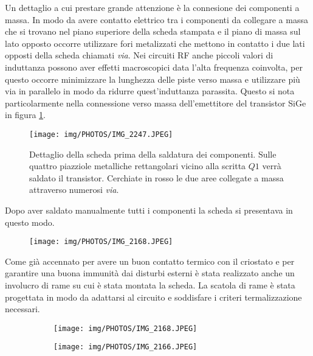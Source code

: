 \documentclass[12pt,oneside]{book}
\begin{document}
Un dettaglio a cui prestare grande attenzione è la connesione dei componenti a massa. In modo da avere contatto elettrico tra i componenti da collegare a massa che si trovano nel piano superiore della scheda stampata e il piano di massa sul lato opposto occorre utilizzare fori metalizzati che mettono in contatto i due lati opposti della scheda chiamati \textit{via}. Nei circuiti RF anche piccoli valori di induttanza possono aver effetti macroscopici data l'alta frequenza coinvolta, per questo occorre minimizzare la lunghezza delle piste verso massa e utilizzare più via in parallelo in modo da ridurre quest'induttanza parassita. Questo si nota particolarmente nella connessione verso massa dell'emettitore del transistor SiGe in figura \ref{sige_ground}.

\begin{figure}[!htbp]
    \centering

    \texttt{[image: img/PHOTOS/IMG\_2247.JPEG]}
    \caption{Dettaglio della scheda prima della saldatura dei componenti. Sulle quattro piazziole metalliche rettangolari vicino alla scritta $Q1$ verrà saldato il transistor. Cerchiate in rosso le due aree collegate a massa attraverso numerosi \textit{via}.}
    \label{sige_ground}
\end{figure}

Dopo aver saldato manualmente tutti i componenti la scheda si presentava in questo modo.

\begin{figure}[!htbp]
    \centering

        \texttt{[image: img/PHOTOS/IMG\_2168.JPEG]}
        \caption{}
    \hfill
\end{figure}

Come già accennato per avere un buon contatto termico con il criostato e per garantire una buona immunità dai disturbi esterni è stata realizzato anche un involucro di rame su cui è stata montata la scheda. La scatola di rame è stata progettata in modo da adattarsi al circuito e soddisfare i criteri termalizzazione necessari.

\begin{figure}[!htbp]
    \centering
    \begin{subfigure}[t]{0.48\textwidth}
        \centering
        \texttt{[image: img/PHOTOS/IMG\_2168.JPEG]}
        \caption{}
    \end{subfigure}
    \hfill
    \begin{subfigure}[t]{0.48\textwidth}
        \centering
        \texttt{[image: img/PHOTOS/IMG\_2166.JPEG]}
        \caption{}
    \end{subfigure}
    \hfill
\end{figure}
\end{document}
